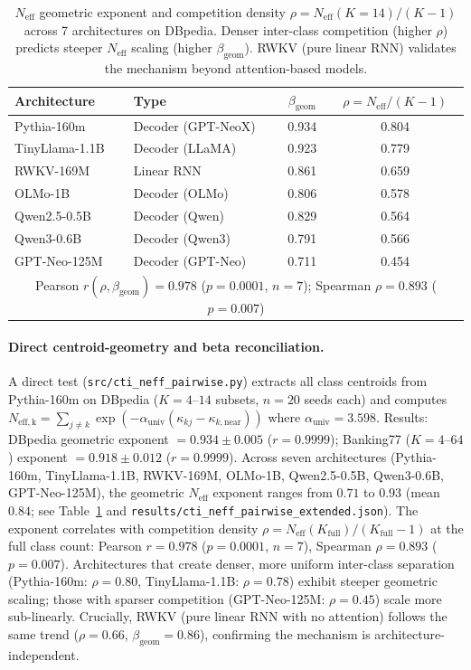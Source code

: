 \documentclass{article}
\begin{document}
\begin{table}[h]
\centering
\caption{$N_\mathrm{eff}$ geometric exponent and competition density $\rho=N_\mathrm{eff}(K{=}14)/(K-1)$
across 7 architectures on DBpedia. Denser inter-class competition (higher $\rho$) predicts
steeper $N_\mathrm{eff}$ scaling (higher $\beta_\mathrm{geom}$). RWKV (pure linear RNN)
validates the mechanism beyond attention-based models.}
\label{tab:neff-competition-density}
\small
\begin{tabular}{llcc}
\toprule
Architecture & Type & $\beta_\mathrm{geom}$ & $\rho = N_\mathrm{eff}/(K-1)$ \\
\midrule
Pythia-160m     & Decoder (GPT-NeoX) & 0.934 & 0.804 \\
TinyLlama-1.1B  & Decoder (LLaMA)    & 0.923 & 0.779 \\
RWKV-169M       & Linear RNN         & 0.861 & 0.659 \\
OLMo-1B         & Decoder (OLMo)     & 0.806 & 0.578 \\
Qwen2.5-0.5B    & Decoder (Qwen)     & 0.829 & 0.564 \\
Qwen3-0.6B      & Decoder (Qwen3)    & 0.791 & 0.566 \\
GPT-Neo-125M    & Decoder (GPT-Neo)  & 0.711 & 0.454 \\
\midrule
\multicolumn{4}{c}{Pearson $r(\rho, \beta_\mathrm{geom})=0.978$ ($p=0.0001$, $n=7$);
  Spearman $\rho=0.893$ ($p=0.007$)} \\
\bottomrule
\end{tabular}
\end{table}

\paragraph{Direct centroid-geometry and beta reconciliation.}
A direct test (\texttt{src/cti\_neff\_pairwise.py}) extracts all class centroids from Pythia-160m
on DBpedia ($K=4$--$14$ subsets, $n=20$ seeds each) and computes
$N_\mathrm{eff,k}=\sum_{j\neq k}\exp(-\alpha_\mathrm{univ}(\kappa_{kj}-\kappa_{k,\mathrm{near}}))$
where $\alpha_\mathrm{univ}=3.598$.
Results: DBpedia geometric exponent $=0.934\pm0.005$ ($r=0.9999$);
Banking77 ($K=4$--$64$) exponent $=0.918\pm0.012$ ($r=0.9999$).
Across seven architectures (Pythia-160m, TinyLlama-1.1B, RWKV-169M, OLMo-1B, Qwen2.5-0.5B, Qwen3-0.6B, GPT-Neo-125M), the geometric
$N_\mathrm{eff}$ exponent ranges from $0.71$ to $0.93$ (mean $0.84$; see
Table~\ref{tab:neff-competition-density} and \texttt{results/cti\_neff\_pairwise\_extended.json}).
The exponent correlates with competition density $\rho=N_\mathrm{eff}(K_\mathrm{full})/(K_\mathrm{full}-1)$
at the full class count: Pearson $r=0.978$ ($p=0.0001$, $n=7$), Spearman $\rho=0.893$ ($p=0.007$).
Architectures that create denser, more uniform inter-class separation
(Pythia-160m: $\rho=0.80$, TinyLlama-1.1B: $\rho=0.78$) exhibit steeper geometric scaling; those with sparser competition
(GPT-Neo-125M: $\rho=0.45$) scale more sub-linearly.
Crucially, RWKV (pure linear RNN with no attention) follows the same trend ($\rho=0.66$, $\beta_\mathrm{geom}=0.86$),
confirming the mechanism is architecture-independent.
\end{document}
